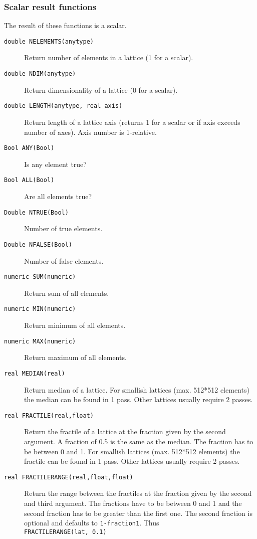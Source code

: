 \subsubsection{Scalar result functions}
The result of these functions is a scalar.
\begin{description}
  \item[ \texttt{double NELEMENTS(anytype)}]
    Return number of elements in a lattice (1 for a scalar).
  \item[ \texttt{double NDIM(anytype)}]
    Return dimensionality of a lattice (0 for a scalar).
  \item[ \texttt{double LENGTH(anytype, real axis)}]
    Return length of a lattice axis (returns 1 for a scalar or if axis
    exceeds number of axes). Axis number is 1-relative.
  \item[ \texttt{Bool ANY(Bool)}] Is any element true?
  \item[ \texttt{Bool ALL(Bool)}] Are all elements true?
  \item[ \texttt{Double NTRUE(Bool)}] Number of true elements.
  \item[ \texttt{Double NFALSE(Bool)}] Number of false elements.
  \item[ \texttt{numeric SUM(numeric)}] Return sum of all elements.
  \item[ \texttt{numeric MIN(numeric)}] Return minimum
    of all elements.
  \item[ \texttt{numeric MAX(numeric)}] Return maximum
    of all elements.
  \item[ \texttt{real MEDIAN(real)}]
    Return median of a lattice. For smallish lattices
    (max. 512*512 elements) the median can be found in 1 pass.
    Other lattices usually require 2 passes.
  \item[ \texttt{real FRACTILE(real,float)}]
    Return the fractile of a lattice at the fraction given by the second
    argument. A fraction of 0.5 is the same as the median.
    The fraction has to be between 0 and 1.
    For smallish lattices (max. 512*512 elements) the fractile can be
    found in 1 pass. Other lattices usually require 2 passes.
  \item[ \texttt{real FRACTILERANGE(real,float,float)}]
    Return the range between the fractiles at the fraction given by
    the second and third argument.
    The fractions have to be between 0 and 1 and the second fraction
    has to be greater than the first one.
    The second fraction is optional and defaults to \texttt{1-fraction1}.
    Thus
    \\\texttt{FRACTILERANGE(lat, 0.1)}

\end{description}
